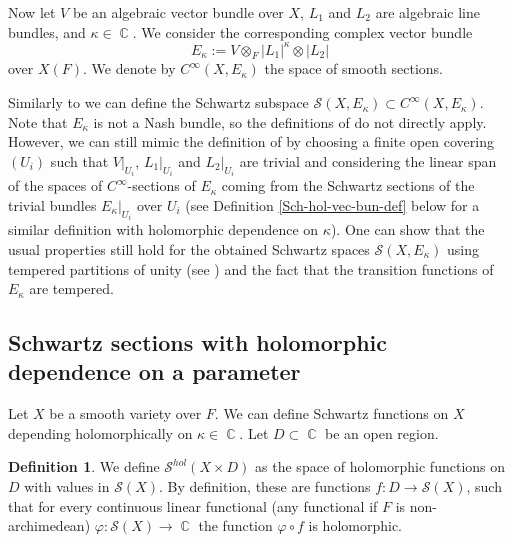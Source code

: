 \documentclass[12pt,reqno]{amsart}
\DeclareMathOperator\C{\mathbb C}
\theoremstyle{definition}
\newtheorem{definition}[theorem]{Definition}
\theoremstyle{remark}
\numberwithin{equation}{section}
\newcommand{\ot}{\otimes}
\newcommand{\DD}{{\mathcal D}}
\renewcommand{\SS}{{\mathcal S}}
\newcommand{\OO}{{\mathcal O}}
\newcommand{\sub}{\subset}
\begin{document}
Now let $V$ be an algebraic vector bundle over $X$, $L_1$ and $L_2$ are algebraic line bundles, and $\kappa\in\C$.
We consider the corresponding complex vector bundle
$$E_{\kappa}:=V\ot_F |L_1|^{\kappa}\ot |L_2|$$
over $X(F)$.
We denote by $C^\infty(X,E_{\kappa})$ the space of smooth sections.

Similarly to \cite{AG} we can define the Schwartz subspace $\SS(X,E_{\kappa})\sub C^\infty(X,E_{\kappa})$.
Note that $E_{\kappa}$ is not a Nash bundle, so the definitions of \cite{AG} do not directly apply. However,
we can still mimic the definition of \cite{AG} by choosing a finite open covering $(U_i)$ such that $V|_{U_i}$, $L_1|_{U_i}$ and $L_2|_{U_i}$
are trivial and considering the linear span of the spaces of $C^\infty$-sections of $E_{\kappa}$ coming from the Schwartz sections of the trivial bundles
$E_{\kappa}|_{U_i}$ over $U_i$ (see Definition \ref{Sch-hol-vec-bun-def} below for a similar definition with holomorphic dependence on $\kappa$).
One can show that the usual properties still hold for the obtained Schwartz spaces $\SS(X,E_{\kappa})$ using tempered partitions of unity
(see \cite[Thm.\ 5.2.1]{AG}) and the fact that the transition functions of $E_{\kappa}$ are tempered.


\subsection{Schwartz sections with holomorphic dependence on a parameter}


Let $X$ be a smooth variety over $F$. We can define Schwartz functions on $X$ depending holomorphically on $\kappa\in \C$.
Let $D\sub \C$ be an open region. 

\begin{definition} We define $\SS^{hol}(X\times D)$ as the space of holomorphic functions on $D$ with values in $\SS(X)$. By definition, these are functions
$f:D\to \SS(X)$, such that for every continuous linear functional (any functional if $F$ is non-archimedean) $\varphi:\SS(X)\to \C$ the function $\varphi\circ f$ is holomorphic.
\end{definition}
\end{document}
